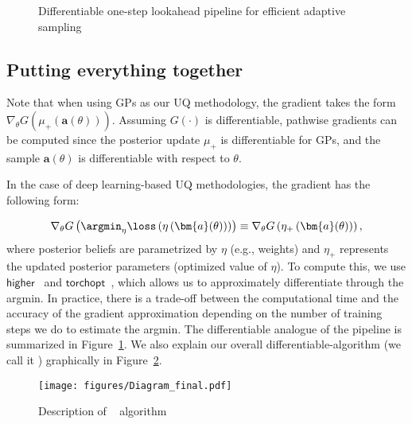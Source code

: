 \begin{figure}[t]
\caption{Differentiable one-step lookahead pipeline for efficient adaptive sampling}
\label{fig:diff_one_step_look_ahead}
\end{figure}





\subsection{Putting everything together}


Note that when using GPs as our UQ methodology, the gradient takes the form $\nabla_{\theta} G\left(\mu_+\left(\bm{a}(\theta)\right)\right)$. Assuming $G(\cdot)$ is differentiable, pathwise gradients can be computed since the posterior update $\mu_+$ is differentiable for GPs, and the sample $\bm{a}(\theta)$ is differentiable with respect to $\theta$.

In the case of deep learning-based UQ methodologies, the gradient has the following form:

\[\nabla_{\theta} G\left( \argmin_{\eta} \loss \left(\eta\left(\bm{a}(\theta)\right)\right) \right) \equiv \nabla_{\theta} G\left( \eta_+\left(\bm{a}(\theta)\right) \right), \] 
where posterior beliefs are parametrized by $\eta$ (e.g., \ensembleplus weights) and $\eta_{+}$ represents the updated posterior parameters (optimized value of $\eta$). 
To compute this, we use $\mathsf{higher}$~\citep{GrefenstetteAmYaHtMoMeKiChCh19} and $\mathsf{torchopt}$~\citep{RenFeLiPaFuMaYa23}, which allows us to approximately differentiate through the argmin. In practice, there is a trade-off between the computational time and the accuracy of the gradient approximation depending on the number of training steps we do to estimate the argmin. 
The differentiable analogue of the  pipeline  is summarized in Figure~\ref{fig:diff_one_step_look_ahead}. We also explain our overall differentiable-algorithm (we call it \ouralgo) graphically in Figure~\ref{fig:Graphical_presentation}. %


\begin{figure}[h]
\centering
\texttt{[image: figures/Diagram\_final.pdf]}
\caption{Description of \ouralgo ~ algorithm}
\label{fig:Graphical_presentation}
\end{figure}

 
